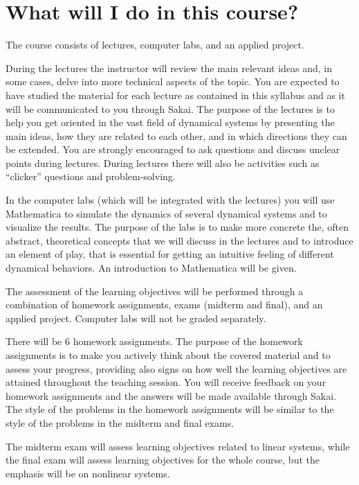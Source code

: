 \documentclass[11pt]{article}
\begin{document}


\section{What will I do in this course?}

The course consists of lectures, computer labs, and an applied project. 

During the lectures the instructor will review the main relevant ideas and, in some cases, delve into more technical aspects of the topic. You are expected to have studied the material for each lecture as contained in this syllabus and as it will be communicated to you through Sakai. The purpose of the lectures is to help you get oriented in the vast field of dynamical systems by presenting the main ideas, how they are related to each other, and in which directions they can be extended. You are strongly encouraged to ask questions and discuss unclear points during lectures. During lectures there will also be activities such as “clicker” questions and problem-solving.

In the computer labs (which will be integrated with the lectures) you will use Mathematica to simulate the dynamics of several dynamical systems and to visualize the results. The purpose of the labs is to make more concrete the, often abstract, theoretical concepts that we will discuss in the lectures and to introduce an element of play, that is essential for getting an intuitive feeling of different dynamical behaviors. An introduction to Mathematica will be given. 

The assessment of the learning objectives will be performed through a combination of homework assignments, exams (midterm and final), and an applied project. Computer labs will not be graded separately.

There will be 6 homework assignments. The purpose of the homework assignments is to make you actively think about the covered material and to assess your progress, providing also signs on how well the learning objectives are attained throughout the teaching session. You will receive feedback on your homework assignments and the answers will be made available through Sakai. The style of the problems in the homework assignments will be similar to the style of the problems in the midterm and final exams.

The midterm exam will assess learning objectives related to linear systems, while the final exam will assess learning objectives for the whole course, but the emphasis will be on nonlinear systems.
\end{document}
